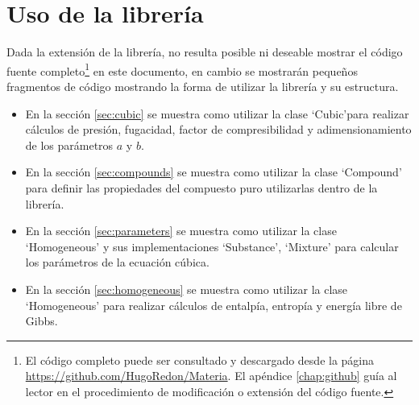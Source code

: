 \chapter{Uso de la librería}\label{chap:libraryUse}
	
	Dada la extensión de la librería, no resulta posible ni deseable mostrar el código fuente completo\footnote{El código completo puede ser consultado y descargado desde la página \url{https://github.com/HugoRedon/Materia}. El apéndice \ref{chap:github} guía al lector en el procedimiento de modificación o extensión del código fuente.} en este documento, en cambio se mostrarán pequeños fragmentos de código mostrando la forma de utilizar la librería y su estructura.
		

	\begin{itemize}
		\item En la sección \ref{sec:cubic} se muestra como utilizar la clase `Cubic'para realizar cálculos de presión, fugacidad, factor de compresibilidad y adimensionamiento de los parámetros $a$ y $b$.
		\item En la sección \ref{sec:compounds} se muestra como utilizar la clase `Compound' para definir las propiedades del compuesto puro utilizarlas dentro de la librería.
		\item En la sección \ref{sec:parameters} se muestra como utilizar la clase `Homogeneous' y sus implementaciones `Substance', `Mixture' para calcular los parámetros de la ecuación cúbica.
		\item En la sección \ref{sec:homogeneous} se muestra como utilizar la clase `Homogeneous' para realizar cálculos de entalpía, entropía y energía libre de Gibbs.
	\end{itemize}
